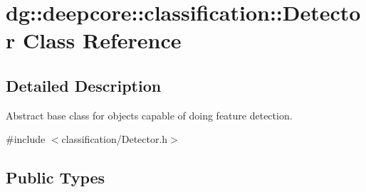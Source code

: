 \hypertarget{classdg_1_1deepcore_1_1classification_1_1_detector}{}\section{dg\+:\+:deepcore\+:\+:classification\+:\+:Detector Class Reference}
\label{classdg_1_1deepcore_1_1classification_1_1_detector}


\subsection{Detailed Description}
Abstract base class for objects capable of doing feature detection. 

{\ttfamily \#include $<$classification/\+Detector.\+h$>$}

\subsection*{Public Types}
